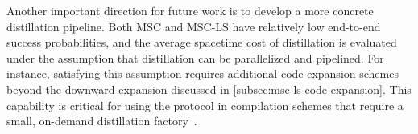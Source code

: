 Another important direction for future work is to develop a more concrete distillation pipeline.
Both MSC and MSC-LS have relatively low end-to-end success probabilities, and the average spacetime cost of distillation is evaluated under the assumption that distillation can be parallelized and pipelined.
For instance, satisfying this assumption requires additional code expansion schemes beyond the downward expansion discussed in \autoref{subsec:msc-ls-code-expansion}.
This capability is critical for using the protocol in compilation schemes that require a small, on-demand distillation factory~\cite{hirano2025locality}.
